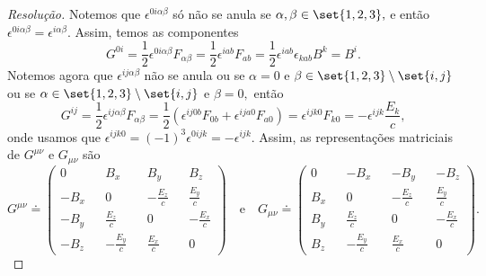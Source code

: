 \begin{proof}[Resolução]
   Notemos que \(\epsilon^{0i \alpha \beta}\) só não se anula se \(\alpha,\beta \in \set{1,2,3},\) e então \(\epsilon^{0 i \alpha \beta} = \epsilon^{i\alpha \beta}.\) Assim, temos as componentes
   \begin{equation*}
      G^{0i} = \frac12 \epsilon^{0i \alpha \beta} F_{\alpha \beta} = \frac12 \epsilon^{i a b} F_{ab} = \frac12 \epsilon^{i a b} \epsilon_{k ab} B^k = B^i.
   \end{equation*}
   Notemos agora que \(\epsilon^{ij \alpha \beta}\) não se anula ou se \(\alpha = 0\) e \(\beta \in \set{1,2,3} \setminus \set{i,j}\) ou se \(\alpha \in \set{1,2,3} \setminus \set{i,j}\) e \(\beta = 0,\) então
   \begin{equation*}
      G^{ij} = \frac12 \epsilon^{ij \alpha \beta} F_{\alpha \beta} = \frac12 (\epsilon^{ij 0 b} F_{0 b} + \epsilon^{ij a 0} F_{a 0}) = \epsilon^{ijk0}F_{k 0} = -\epsilon^{ijk}\frac{E_k}{c},
   \end{equation*}
   onde usamos que \(\epsilon^{ijk0} = (-1)^3 \epsilon^{0ijk} = - \epsilon^{ijk}.\)
   Assim, as representações matriciais de \(G^{\mu\nu}\) e \(G_{\mu\nu}\) são
   \begin{equation*}
      G^{\mu\nu} \doteq \begin{pmatrix}
         0 && B_x && B_y && B_z\\
         -B_x && 0 && -\frac{E_z}{c} && \frac{E_y}{c}\\
         -B_y && \frac{E_z}{c} && 0 && -\frac{E_x}{c}\\
         -B_z && -\frac{E_y}{c} && \frac{E_x}{c} && 0
      \end{pmatrix}
      \quad\text{e}\quad
      G_{\mu\nu} \doteq \begin{pmatrix}
         0 && -B_x && -B_y && -B_z\\
         B_x && 0 && -\frac{E_z}{c} && \frac{E_y}{c}\\
         B_y && \frac{E_z}{c} && 0 && -\frac{E_x}{c}\\
         B_z && -\frac{E_y}{c} && \frac{E_x}{c} && 0
      \end{pmatrix}.
   \end{equation*}


\end{proof}
